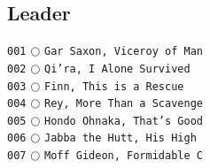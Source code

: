 \documentclass[a4paper,landscape]{article}
\begin{document}
\fontsize{8}{8}\selectfont

\begin{multicols*}{5}
    \section{Leader} 
\vspace{-2mm} 
\texttt{001} \(\bigcirc\)  \texttt{Gar Saxon, Viceroy of Man} \vspace{-0.3mm}\\ 
\texttt{002} \(\bigcirc\)  \texttt{Qi’ra, I Alone Survived} \vspace{-0.3mm}\\ 
\texttt{003} \(\bigcirc\)  \texttt{Finn, This is a Rescue} \vspace{-0.3mm}\\ 
\texttt{004} \(\bigcirc\)  \texttt{Rey, More Than a Scavenge} \vspace{-0.3mm}\\ 
\texttt{005} \(\bigcirc\)  \texttt{Hondo Ohnaka, That’s Good} \vspace{-0.3mm}\\ 
\texttt{006} \(\bigcirc\)  \texttt{Jabba the Hutt, His High } \vspace{-0.3mm}\\ 
\texttt{007} \(\bigcirc\)  \texttt{Moff Gideon, Formidable C} \vspace{-0.3mm}\\ 

\end{multicols*}
\end{document}
